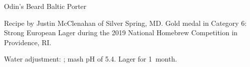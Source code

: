 \begin{recipe}{Odin's Beard Baltic Porter} %

\begin{aboutblock}
Recipe by Justin McClenahan of Silver Spring, MD. Gold medal in Category 6:
Strong European Lager during the 2019 National Homebrew Competition in
Providence, RI. \sourceaha
\end{aboutblock}


\begin{methodandtiming}
 
\begin{mashsteps}
\end{mashsteps}

\begin{fermentationsteps}
\end{fermentationsteps}

\begin{directions}
Water adjustment: ; mash pH of 5.4.
Lager for 1~month.
\end{directions}

\end{methodandtiming}

\recipebreak

\begin{ingredientsblock}

\begin{malts}
\end{malts}

\begin{hops}
\end{hops}

\begin{yeastsx}
\end{yeastsx}

\end{ingredientsblock}

\end{recipe}
